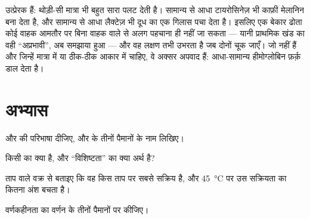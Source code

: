 \begin{remark}\label{rem:g11:enzymes-and-phenotype:recessive}
 उत्प्रेरक हैं: थोड़ी-सी मात्रा भी बहुत सारा  पलट देती है।
सामान्य से आधा टायरोसिनेज़ भी काफ़ी मेलानिन बना देता है, और सामान्य से आधा
लैक्टेज़ भी दूध का एक गिलास पचा देता है। इसलिए एक बेकार  ढोता कोई
वाहक आमतौर पर बिना वाहक वाले से अलग पहचाना ही नहीं जा सकता --- यानी
प्राथमिक खंड का वही ``अप्रभावी'', अब समझाया हुआ --- और वह लक्षण तभी उभरता
है जब दोनों  चूक जाएँ। जो   नहीं हैं और जिन्हें मात्रा
में या ठीक-ठीक आकार में चाहिए, वे अक्सर अपवाद हैं: आधा-सामान्य हीमोग्लोबिन
फ़र्क़ डाल देता है।
\end{remark}

\section{अभ्यास}

\begin{exercise}[$\star$]\label{exo:g11:enzymes-and-phenotype:1}
 और  की परिभाषा दीजिए, और  के तीनों पैमानों
के नाम लिखिए।
\end{exercise}

\begin{exercise}[$\star$]\label{exo:g11:enzymes-and-phenotype:2}
किसी  का  क्या है, और ``विशिष्टता'' का क्या अर्थ है?
\end{exercise}

\begin{exercise}[$\star$]\label{exo:g11:enzymes-and-phenotype:3}
ताप वाले वक्र से बताइए कि वह  किस ताप पर सबसे सक्रिय है, और
\qty{45}{\celsius} पर उस सक्रियता का कितना अंश बचता है।
\end{exercise}

\begin{exercise}[$\star$]\label{exo:g11:enzymes-and-phenotype:4}
वर्णकहीनता का वर्णन  के तीनों पैमानों पर कीजिए।
\end{exercise}

